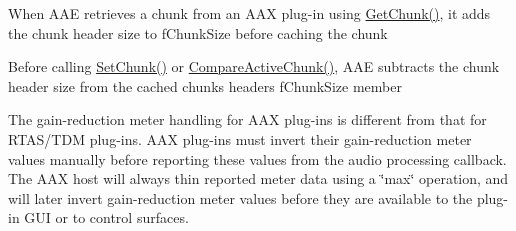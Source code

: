 \begin{DoxyRefList}
\begin{DoxyItemize}
\item When AAE retrieves a chunk from an AAX plug-\/in using \mbox{\hyperlink{a02068_ab977041a440a9cd6f3e631c059ee8b99}{Get\+Chunk()}}, it adds the chunk header size to {\ttfamily f\+Chunk\+Size} before caching the chunk ~\newline

\item Before calling \mbox{\hyperlink{a02068_a2d780ebc594683e24302871b809602e8}{Set\+Chunk()}} or \mbox{\hyperlink{a02068_a1e86f849e970c9998313fc7d451ccf85}{Compare\+Active\+Chunk()}}, AAE subtracts the chunk header size from the cached chunk\textquotesingle{}s header\textquotesingle{}s {\ttfamily f\+Chunk\+Size} member 
\end{DoxyItemize}
\item[Module \mbox{\hyperlink{a00903}{Additional\+Features\+\_\+\+Meters}} ]\label{a00880__porting_notes000001}%
%
 The gain-\/reduction meter handling for AAX plug-\/ins is different from that for RTAS/\+TDM plug-\/ins. AAX plug-\/ins must invert their gain-\/reduction meter values manually before reporting these values from the audio processing callback. The AAX host will always thin reported meter data using a \char`\"{}max\char`\"{} operation, and will later invert gain-\/reduction meter values before they are available to the plug-\/in GUI or to control surfaces. 
\end{DoxyRefList}